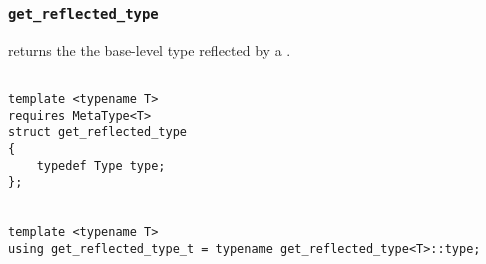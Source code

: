 
\subsubsection{\texttt{get\_reflected\_type}}

returns the the base-level type reflected by a .

\begin{verbatim}

template <typename T>
requires MetaType<T>
struct get_reflected_type
{
	typedef Type type;
};


template <typename T>
using get_reflected_type_t = typename get_reflected_type<T>::type;

\end{verbatim}
